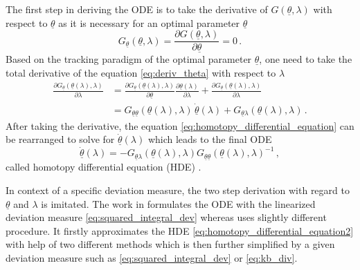 \documentclass[a4paper]{IEEEtran}
\begin{document}
The first step in deriving the ODE is to take the derivative of $G(\underline{\theta},\lambda)$ with respect to $\underline{\theta}$ as it is necessary for an optimal parameter $\underline{\theta}$
\begin{equation}
    G_{\underline{\theta}}(\underline{\theta}, \lambda) = \frac{\partial G(\underline{\theta}, \lambda)}{\partial \underline{\theta}} = 0 \,.
    \label{eq:deriv_theta}
\end{equation}
Based on the tracking paradigm of the optimal parameter $\underline{\theta}$, one need to take the total derivative of the equation \eqref{eq:deriv_theta} with respect to $\lambda$
\begin{equation}
    \begin{split}
        \frac{\partial G_{\underline{\theta}}(\underline{\theta}(\lambda),\lambda)}{\partial \lambda} &= \frac{\partial G_{\underline{\theta}}(\underline{\theta}(\lambda),\lambda)}{\partial \underline{\theta}} \frac{\partial \underline{\theta}(\lambda)}{\partial \lambda} + \frac{\partial G_{\underline{\theta}}(\underline{\theta}(\lambda),\lambda)}{\partial \lambda} \\
        &= G_{\underline{\theta}\underline{\theta}}(\underline{\theta}(\lambda),\lambda) \, \underline{\dot{\theta}}(\lambda) + G_{\underline{\theta}\lambda}(\underline{\theta}(\lambda),\lambda) \,.
    \end{split}
    \label{eq:homotopy_differential_equation}
\end{equation}
After taking the derivative, the equation \eqref{eq:homotopy_differential_equation} can be rearranged to solve for $\underline{\dot{\theta}}(\lambda)$ which leads to the final ODE
\begin{equation}
    \underline{\dot{\theta}}(\lambda) = - G_{\underline{\theta}\lambda}(\underline{\theta}(\lambda),\lambda) G_{\underline{\theta}\underline{\theta}}(\underline{\theta}(\lambda),\lambda)^{-1} \,,
    \label{eq:homotopy_differential_equation2}
\end{equation}
called homotopy differential equation (HDE) \cite{hagmar2011}.

In context of a specific deviation measure, the two step derivation with regard to $\underline{\theta}$ and $\lambda$ is imitated. The work in \cite{hanebeck2003} formulates the ODE with the linearized deviation measure \eqref{eq:squared_integral_dev} whereas \cite{hagmar2011} uses slightly different
procedure. It firstly approximates the HDE \eqref{eq:homotopy_differential_equation2} with help of two different methods which is then further simplified
by a given deviation measure such as \eqref{eq:squared_integral_dev} or \eqref{eq:kb_div}. 
\end{document}

